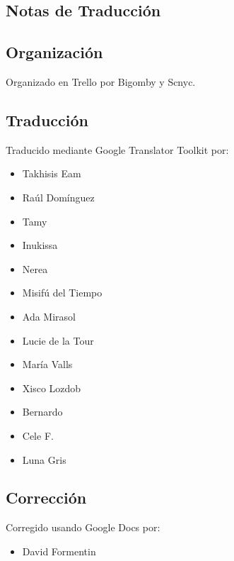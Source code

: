 \begin{center}
\section*{Notas de Traducción}
\end{center}

\mbox{}

\begingroup
\fontsize{9pt}{10pt}\selectfont
\parindent=0pt
\begin{multicols}{2}

\subsection*{Organización}\label{organizaciuxf3n}

Organizado en Trello por Bigomby y Scnyc.

\subsection*{Traducción}\label{traducciuxf3n}

Traducido mediante Google Translator Toolkit por:

\begin{itemize}
\itemsep1pt\parskip0pt
\item
  Takhisis Eam
\item
  Raúl Domínguez
\item
  Tamy
\item
  Inukissa
\item
  Nerea
\item
  Misifú del Tiempo
\item
  Ada Mirasol
\item
  Lucie de la Tour
\item
  María Valls
\item
  Xisco Lozdob
\item
  Bernardo
\item
  Cele F.
\item
  Luna Gris
\end{itemize}

\subsection*{Corrección}\label{correcciuxf3n}

Corregido usando Google Docs por:

\begin{itemize}
\itemsep1pt\parskip0pt
\item
  David Formentin
\end{itemize}


\end{multicols}
